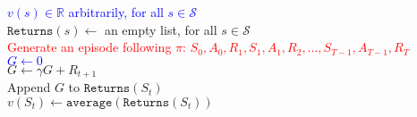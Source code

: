 \documentclass{standalone}
\begin{document}
\pagestyle{empty}
\begin{algorithm}[H]
  \textcolor{blue}{$v(s) \in \mathbb R$ arbitrarily, for all $s \in \mathcal S$ \\}
  $\texttt{Returns}(s) \gets$ an empty list, for all $s \in \mathcal S$ \\
   {
    \textcolor{red}{Generate an episode following $\pi$: $S_0, A_0, R_1, S_1, A_1, R_2,     \ldots,S_{T-1}, A_{T-1}, R_T$ \\}
    \textcolor{blue}{$G\gets 0$ \\}
     {
      $G \gets \gamma G + R_{t+1}$ \\
       {
        Append $G$ to $\texttt{Returns}(S_t)$ \\
        $v(S_t) \gets \texttt{average}(\texttt{Returns}(S_t))$
      }
    }
  }
\end{algorithm}
\end{document}

